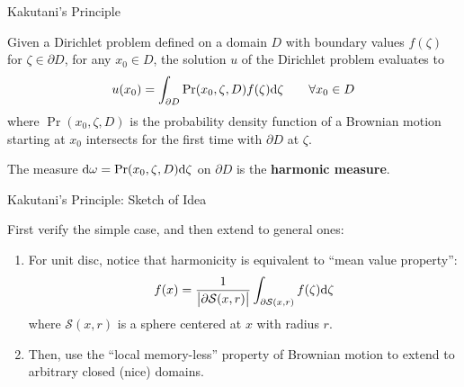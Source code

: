 \documentclass{beamer}
\begin{document}
\begin{frame}{Kakutani's Principle}

	\begin{theorem}[Kakutani, 1944]
		Given a Dirichlet problem defined on a domain $D$ with boundary values $f(\zeta)$ for $\zeta \in \partial D$, for any $x_0 \in D$, the solution $u$ of the Dirichlet problem evaluates to
    	\[
        	u(x_0) = \int_{\partial D} \mathrm{Pr}(x_0, \zeta, D) f(\zeta) \mathrm{d} \zeta \qquad \forall x_0 \in D
    	\]
    	where $\Pr(x_0, \zeta, D)$ is the probability density function of a Brownian motion starting at $x_0$ intersects for the first time with $\partial D$ at $\zeta$.
	\end{theorem}
	\horzline

	\begin{definition}
		The measure $\mathrm{d} \omega = \mathrm{Pr}(x_0, \zeta, D) \mathrm{d} \zeta$ on $\partial D$ is the \textbf{harmonic measure}.
	\end{definition}
	\horzline

\end{frame}

\begin{frame}{Kakutani's Principle: Sketch of Idea}

	First verify the simple case, and then extend to general ones:
	\begin{enumerate}
		\item For unit disc, notice that harmonicity is equivalent to ``mean value property'':
        \[
            f(x) = \frac{1}{\left|\partial \mathcal{S}(x, r)\right|}\int_{\partial \mathcal{S}(x, r)} f(\zeta) \mathrm{d} \zeta
        \]
		where $\mathcal{S}(x, r)$ is a sphere centered at $x$ with radius $r$.
		\item Then, use the ``local memory-less'' property of Brownian motion to extend to arbitrary closed (nice) domains.
	\end{enumerate}

\end{frame}
\end{document}
